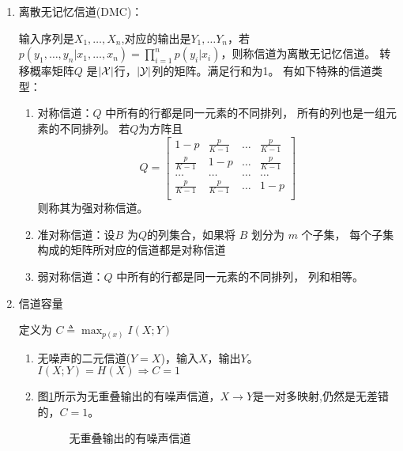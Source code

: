 \documentclass{article}
\DeclarePairedDelimiter\abs{\lvert}{\rvert}
\begin{document}
\begin{enumerate}
\item 离散无记忆信道(DMC)：

输入序列是$X_1,\dots,X_n$,对应的输出是$Y_1,\dots Y_n$，若$p(y_1,\dots,y_n | x_1,\dots,x_n) = \prod_{i=1}^n p(y_i | x_i) $，则称信道为离散无记忆信道。
转移概率矩阵$Q$ 是$\abs{\mathcal{X}}$行，$\abs{\mathcal{Y}}$列的矩阵。满足行和为1。
有如下特殊的信道类型：
\begin{enumerate}
    \item 对称信道：$Q$ 中所有的行都是同一元素的不同排列， 所有的列也是一组元素的不同排列。
    若$Q$为方阵且
    $$
      Q = \begin{bmatrix}
        1-p & \frac{p}{K-1} & \dots & \frac{p}{K-1} \\
        \frac{p}{K-1} & 1-p & \dots & \frac{p}{K-1} \\
        \dots & \dots & \dots & \dots \\
        \frac{p}{K-1} & \frac{p}{K-1} & \dots & 1-p \\
      \end{bmatrix}
    $$
    则称其为强对称信道。
    \item 准对称信道：设$B$ 为$Q$的列集合，如果将 $B$ 划分为 $m$ 个子集， 每个子集构成的矩阵所对应的信道都是对称信道
    \item 弱对称信道：$Q$ 中所有的行都是同一元素的不同排列， 列和相等。
\end{enumerate}
\item 信道容量

定义为
$
C\triangleq \max_{p(x)}I(X;Y)
$
\begin{enumerate}
\item 无噪声的二元信道($Y=X$)，输入$X$，输出$Y$。$I(X;Y)=H(X)\Rightarrow C=1$

\item 图\ref{fig:non_overlapping_noisy_channel}所示为无重叠输出的有噪声信道，$X\to Y$是一对多映射,仍然是无差错的，$C=1$。
\begin{figure}[!ht]
\begin{center}
\end{center}
\caption{无重叠输出的有噪声信道}\label{fig:non_overlapping_noisy_channel}
\end{figure}


\end{enumerate}
\end{enumerate}
\end{document}
